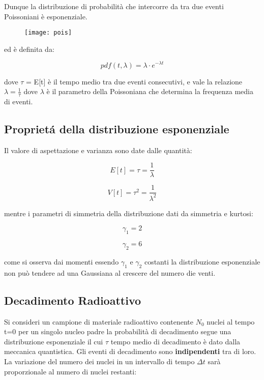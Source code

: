 \documentclass[11pt,a4paper]{book}
\begin{document}
 Dunque la distribuzione di probabilit\`{a} che intercorre da tra due eventi Poissoniani \`{e} esponenziale.
\begin{figure}[ht]
\vspace{0.2in}
\texttt{[image: pois]}	
\centering
\vspace{0.2in}
\end{figure}

ed \`{e} definita da:

\begin{equation}
	pdf(t,\lambda) = \lambda \cdot e^{-\lambda t}
\end{equation}

dove $\tau$ = E[t] \`{e} il tempo medio tra due eventi consecutivi, e vale la relazione $\lambda = \frac{1}{\tau}$ dove $\lambda$ \`{e} il parametro della Poissoniana che determina la frequenza media di eventi. 

\subsection{Propriet\'{a} della distribuzione esponenziale}

Il valore di aspettazione e varianza sono date dalle quantit\`{a}:

\begin{equation}
	E[t] = \tau = \dfrac{1}{\lambda}
\end{equation}

\begin{equation}
	V[t] = \tau^2 = \dfrac{1}{\lambda^2}
\end{equation}

mentre i parametri di simmetria della distribuzione dati da simmetria e kurtosi:

\begin{equation}
	\gamma_1 = 2
\end{equation}

\begin{equation}
	\gamma_2 = 6
\end{equation}

come si osserva dai momenti essendo $\gamma_1$ e $\gamma_2$ costanti la distribuzione esponenziale non pu\`{o} tendere ad una Gaussiana al crescere del numero die venti.

\subsection{Decadimento Radioattivo}

Si consideri un campione di materiale radioattivo contenente $N_{0}$ nuclei al tempo t=0 per un singolo nucleo padre la probabilit\`{a} di decadimento segue una distribuzione esponenziale il cui $\tau$ tempo medio di decadimento \`{e} dato dalla meccanica quantistica. Gli eventi di decadimento sono \textbf{indipendenti} tra di loro.
\newline
La variazione del numero dei nuclei in un intervallo di tempo $\Delta t$ sar\`{a} proporzionale al numero di nuclei restanti:
\end{document}
